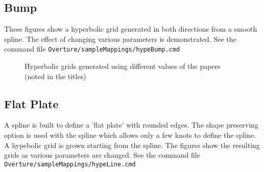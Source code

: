\clearpage
\subsection{Bump}


These figures show a hyperbolic grid generated in both directions
from a smooth spline. The effect of changing various parameters
is demonstrated. See the command file {\tt Overture/sampleMappings/hypeBump.cmd}

{
\newcommand{\figWidthd}{8cm}
\newcommand{\trimfig}[2]{\trimPlotb{#1}{#2}{.0}{.0}{.2}{.0}}
\begin{figure}[hbt]
\begin{center}
\end{center}
\caption{Hyperbolic grids generated using different values of the papers (noted in the titles)}
\end{figure}
}



\clearpage
\subsection{Flat Plate}

A spline is built to define a 'flat plate' with rounded edges.
The shape preserving option is used with the spline which allows
only a few knots to define the spline. A hypebolic grid is grown
starting from the spline. The figures show the resulting grids
as various parameters are changed.
See the command file {\tt Overture/sampleMappings/hypeLine.cmd}

